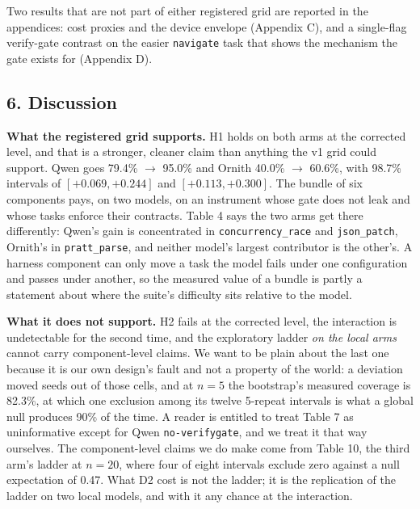 \documentclass[
  10pt,
  a4paper,
]{article}
\let\oldtexttt\texttt
\renewcommand{\texttt}[1]{{\small\oldtexttt{#1}}}
\begin{document}
Two results that are not part of either registered grid are reported in
the appendices: cost proxies and the device envelope (Appendix C), and a
single-flag verify-gate contrast on the easier \texttt{navigate} task
that shows the mechanism the gate exists for (Appendix D).

\subsection{6. Discussion}\label{discussion}

\textbf{What the registered grid supports.} H1 holds on both arms at the
corrected level, and that is a stronger, cleaner claim than anything the
v1 grid could support. Qwen goes 79.4\% \(\to\) 95.0\% and Ornith 40.0\%
\(\to\) 60.6\%, with 98.7\% intervals of \([+0.069, +0.244]\) and
\([+0.113, +0.300]\). The bundle of six components pays, on two models,
on an instrument whose gate does not leak and whose tasks enforce their
contracts. Table 4 says the two arms get there differently: Qwen's gain
is concentrated in \texttt{concurrency\_race} and \texttt{json\_patch},
Ornith's in \texttt{pratt\_parse}, and neither model's largest
contributor is the other's. A harness component can only move a task the
model fails under one configuration and passes under another, so the
measured value of a bundle is partly a statement about where the suite's
difficulty sits relative to the model.

\textbf{What it does not support.} H2 fails at the corrected level, the
interaction is undetectable for the second time, and the exploratory
ladder \emph{on the local arms} cannot carry component-level claims. We
want to be plain about the last one because it is our own design's fault
and not a property of the world: a deviation moved seeds out of those
cells, and at \(n=5\) the bootstrap's measured coverage is 82.3\%, at
which one exclusion among its twelve 5-repeat intervals is what a global
null produces 90\% of the time. A reader is entitled to treat Table 7 as
uninformative except for Qwen \texttt{no-verifygate}, and we treat it
that way ourselves. The component-level claims we do make come from
Table 10, the third arm's ladder at \(n=20\), where four of eight
intervals exclude zero against a null expectation of 0.47. What D2 cost
is not the ladder; it is the replication of the ladder on two local
models, and with it any chance at the interaction.
\end{document}
